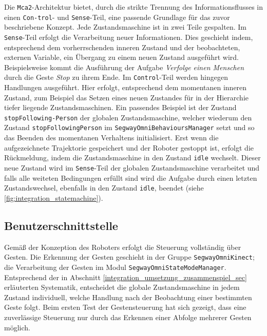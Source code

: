 Die \lstinline{Mca2}-Architektur bietet, durch die strikte Trennung des Informationsflusses in 
einen \lstinline{Con-trol}- und \lstinline{Sense}-Teil, eine passende Grundlage
für das zuvor beschriebene Konzept. Jede Zustandsmaschine ist in zwei Teile gespalten. Im \lstinline{Sense}-Teil 
erfolgt die Verarbeitung neuer Informationen. Dies geschieht indem, entsprechend dem vorherrschenden 
inneren Zustand und der beobachteten, externen Variable, ein Übergang zu einem neuen Zustand 
ausgeführt wird. Beispielsweise kommt die Ausführung der Aufgabe \textit{Verfolge einen Menschen} 
durch die Geste \textit{Stop} zu ihrem Ende. Im \lstinline{Control}-Teil werden hingegen 
Handlungen ausgeführt. Hier erfolgt, entsprechend dem momentanen inneren Zustand, zum Beispiel 
das Setzen eines neuen Zustandes für in der Hierarchie tiefer liegende Zustandsmaschinen. 
Ein passendes Beispiel ist der Zustand \lstinline{stopFollowing-Person} der
globalen Zustandsmaschine, welcher wiederum den Zustand \lstinline{stopFollowingPerson} im
\lstinline{SegwayOmniBehavioursManager} setzt und so das Beenden des momentanen Verhaltens initialisiert. Erst wenn die aufgezeichnete 
Trajektorie gespeichert und der Roboter gestoppt ist, erfolgt die Rückmeldung, indem die 
Zustandsmaschine in den Zustand \lstinline{idle} wechselt. Dieser neue Zustand wird 
im \lstinline{Sense}-Teil der globalen Zustandsmaschine verarbeitet und falls alle weiteten 
Bedingungen erfüllt sind wird die Aufgabe durch einen letzten Zustandswechsel, ebenfalls in 
den Zustand \lstinline{idle}, beendet (siehe \ref{fig:integration_statemachine}).


\subsection{Benutzerschnittstelle}
\label{benutzerschnittstelle_integration_cha}

Gemäß der Konzeption des Roboters erfolgt die Steuerung vollständig über Gesten. Die Erkennung der Gesten 
geschieht in der Gruppe \lstinline{SegwayOmniKinect}; die Verarbeitung der Gesten im Modul \lstinline{SegwayOmniStateModeManager}. Entsprechend der in Abschnitt \ref{integration_umsetzung_zusammenspiel_sec}
 erläuterten Systematik, entscheidet die globale Zustandsmaschine in jedem Zustand individuell, welche Handlung 
 nach der Beobachtung einer bestimmten Geste folgt. Beim ersten Test der Gestensteuerung hat sich gezeigt, 
 dass eine zuverlässige Steuerung nur durch das Erkennen einer Abfolge mehrerer Gesten möglich. 

